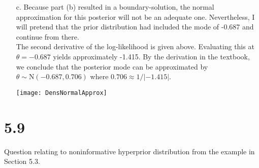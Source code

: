 \documentclass[12pt]{article}
\begin{document}
\begin{enumerate}
	\item[c.] Because part (b) resulted in a boundary-solution, the normal approximation for this posterior will not be an adequate one. Nevertheless, I will pretend that the prior distribution had included the mode of -0.687 and continue from there. \\
	The second derivative of the log-likelihood is given above. Evaluating this at $\theta=-0.687$ yields approximately -1.415. By the derivation in the textbook, we conclude that the posterior mode can be approximated by $\theta \sim \text{N}(-0.687, 0.706)$ where $0.706 \approx 1/|-1.415|$.
	\begin{center}
		\texttt{[image: DensNormalApprox]}
	\end{center}
\end{enumerate}
\section*{5.9} Question relating to noninformative hyperprior distribution from the example in Section 5.3.
\end{document}
